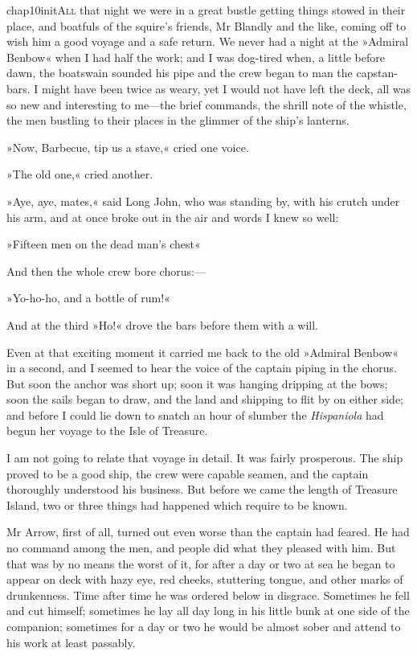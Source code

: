  
   \lettrine[lines=4,image=true]{chap10initA}{ll} that night we were in a great bustle getting things stowed in their place, and boatfuls of the squire's friends, Mr Blandly and the like, coming off to wish him a good voyage and a safe return. We never had a night at the »Admiral Benbow« when I had half the work; and I was dog-tired when, a little before dawn, the boatswain sounded his pipe and the crew began to man the capstan-bars. I might have been twice as weary, yet I would not have left the deck, all was so new and interesting to me—the brief commands, the shrill note of the whistle, the men bustling to their places in the glimmer of the ship's lanterns.

»Now, Barbecue, tip us a stave,« cried one voice.

»The old one,« cried another.

»Aye, aye, mates,« said Long John, who was standing by, with his crutch under his arm, and at once broke out in the air and words I knew so well:

»Fifteen men on the dead man's chest\longdash«

And then the whole crew bore chorus:—

»Yo-ho-ho, and a bottle of rum!«

And at the third »Ho!« drove the bars before them with a will.

Even at that exciting moment it carried me back to the old »Admiral Benbow« in a second, and I seemed to hear the voice of the captain piping in the chorus. But soon the anchor was short up; soon it was hanging dripping at the bows; soon the sails began to draw, and the land and shipping to flit by on either side; and before I could lie down to snatch an hour of slumber the \textit{Hispaniola} had begun her voyage to the Isle of Treasure.

I am not going to relate that voyage in detail. It was fairly prosperous. The ship proved to be a good ship, the crew were capable seamen, and the captain thoroughly understood his business. But before we came the length of Treasure Island, two or three things had happened which require to be known.

Mr Arrow, first of all, turned out even worse than the captain had feared. He had no command among the men, and people did what they pleased with him. But that was by no means the worst of it, for after a day or two at sea he began to appear on deck with hazy eye, red cheeks, stuttering tongue, and other marks of drunkenness. Time after time he was ordered below in disgrace. Sometimes he fell and cut himself; sometimes he lay all day long in his little bunk at one side of the companion; sometimes for a day or two he would be almost sober and attend to his work at least passably.

